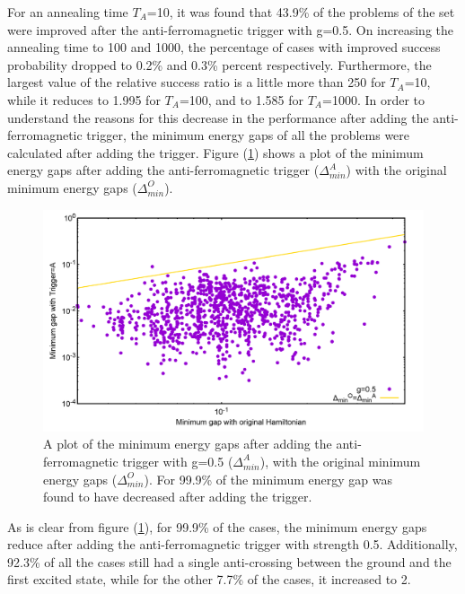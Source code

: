 \documentclass[12]{article}
\begin{document}
For an annealing time $T_A$=10, it was found that 43.9\% of the problems of the set were improved after the anti-ferromagnetic trigger with g=0.5. On increasing the annealing time to 100 and 1000, the percentage of cases with improved success probability dropped to 0.2\% and 0.3\% percent respectively. Furthermore, the largest value of the relative success ratio is a little more than 250 for $T_A$=10, while it reduces to 1.995 for $T_A$=100, and to 1.585 for $T_A$=1000. In order to understand the reasons for this decrease in the performance after adding the anti-ferromagnetic trigger, the minimum energy gaps of all the problems were calculated after adding the trigger. Figure (\ref{fig:a13}) shows a plot of the minimum energy gaps after adding the anti-ferromagnetic trigger ($\Delta_{min}^A$) with the original minimum energy gaps ($\Delta_{min}^O$).
\begin{figure}[H]
\centering 
\includegraphics[scale=0.24]{MinGap_A_g0.png}
\caption{A plot of the minimum energy gaps after adding the anti-ferromagnetic trigger with g=0.5 ($\Delta_{min}^A$), with the original minimum energy gaps ($\Delta_{min}^O$). For 99.9\% of the minimum energy gap was found to have decreased after adding the trigger.}
\label{fig:a13}
\end{figure}
As is clear from figure (\ref{fig:a13}), for 99.9\% of the cases, the minimum energy gaps reduce after adding the anti-ferromagnetic trigger with strength 0.5. Additionally, 92.3\% of all the cases still had a single anti-crossing between the ground and the first excited state, while for the other 7.7\% of the cases, it increased to 2.
\end{document}
